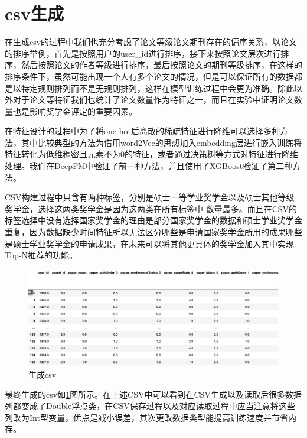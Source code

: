 \section{csv生成}

在生成csv的过程中我们也充分考虑了论文等级论文期刊存在的偏序关系，以论文的排序举例，首先是按照用户的user\_id进行排序，接下来按照论文层次进行排序，然后按照论文的作者等级进行排序，最后按照论文的期刊等级排序，在这样的排序条件下，虽然可能出现一个人有多个论文的情况，但是可以保证所有的数据都是以特定规则排列而不是无规则排列，这样在模型训练过程中会更为准确。除此以外对于论文等特征我们也统计了论文数量作为特征之一，而且在实验中证明论文数量也是影响奖学金评定的重要因素。

在特征设计的过程中为了将one-hot后离散的稀疏特征进行降维可以选择多种方法，其中比较典型的方法为借用word2Vec的思想加入embedding层进行嵌入训练将特征转化为低维稠密且元素不为0的特征，或者通过决策树等方式对特征进行降维处理。我们在DeepFM中验证了前一种方法，并且使用了XGBoost验证了第二种方法。

CSV构建过程中只含有两种标签，分别是硕士一等学业奖学金以及硕士其他等级奖学金，选择这两类奖学金是因为这两类在所有标签中
数量最多。而且在CSV的标签选择中没有选择国家奖学金的理由是部分国家奖学金的数据和硕士学业奖学金重复，因为数据缺少时间特征所以无法区分哪些是申请国家奖学金所用的成果哪些是硕士学业奖学金的申请成果，在未来可以将其他更具体的奖学金加入其中实现Top-N推荐的功能。
\begin{figure}[htb]
    \vspace{6pt} %
    \centering
    \includegraphics[width=0.95\linewidth]{images/Generated-csv.png}
    \caption{生成csv}\label{generated_csv} %
\end{figure}

最终生成的csv如\ref{generated_csv}图所示。在上述CSV中可以看到在CSV生成以及读取后很多数据列都变成了Double浮点类，在CSV保存过程以及对应读取过程中应当注意将这些列改为Int型变量，优点是减小误差，其次更改数据类型能提高训练速度并节省内存。
